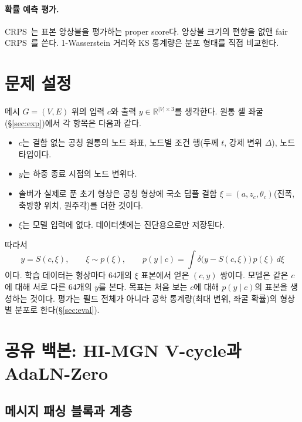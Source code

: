 \documentclass[11pt]{article}
\newcommand{\R}{\mathbb{R}}
\begin{document}
\paragraph{확률 예측 평가.} CRPS~\cite{gneiting2007}는 표본 앙상블을
평가하는 proper score다. 앙상블 크기의 편향을 없앤 fair CRPS~\cite{ferro2014}를
쓴다. 1-Wasserstein 거리와 KS 통계량은 분포 형태를 직접 비교한다.

\section{문제 설정}\label{sec:problem}

메시 $G=(V,E)$ 위의 입력 $c$와 출력 $y\in\R^{|V|\times 3}$를 생각한다. 원통 셸
좌굴(\S\ref{sec:exp})에서 각 항목은 다음과 같다.
\begin{itemize}
\item $c$는 결함 없는 공칭 원통의 노드 좌표, 노드별 조건 행(두께 $t$, 강제
  변위 $\Delta$), 노드 타입이다.
\item $y$는 하중 종료 시점의 노드 변위다.
\item 솔버가 실제로 푼 초기 형상은 공칭 형상에 국소 딤플 결함
  $\xi=(a, z_c, \theta_c)$(진폭, 축방향 위치, 원주각)를 더한 것이다.
\item $\xi$는 모델 입력에 없다. 데이터셋에는 진단용으로만 저장된다.
\end{itemize}
따라서
\begin{equation}
  y = S(c,\xi),\qquad \xi\sim p(\xi),\qquad
  p(y\mid c) = \int \delta\bigl(y - S(c,\xi)\bigr)\,p(\xi)\,d\xi
\end{equation}
이다. 학습 데이터는 형상마다 64개의 $\xi$ 표본에서 얻은 $(c, y)$ 쌍이다.
모델은 같은 $c$에 대해 서로 다른 64개의 $y$를 본다. 목표는 처음 보는 $c$에
대해 $p(y\mid c)$의 표본을 생성하는 것이다. 평가는 필드 전체가 아니라 공학
통계량(최대 변위, 좌굴 확률)의 형상별 분포로 한다(\S\ref{sec:eval}).

\section{공유 백본: HI-MGN V-cycle과 AdaLN-Zero}\label{sec:backbone}

\subsection{메시지 패싱 블록과 계층}
\end{document}
